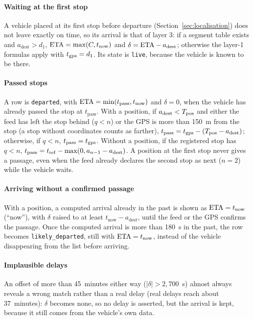 \paragraph{Waiting at the first stop} A vehicle placed at its first stop before departure
(Section~\ref{sec:localisation}) does not leave exactly on time, so its
arrival is that of layer 3: if a segment table exists and $a_{\mathrm{dest}}>d_1$, $\mathrm{ETA}=\max(C,t_{\mathrm{now}})$ and
$\delta=\mathrm{ETA}-a_{\mathrm{dest}}$; otherwise the layer-1 formulas apply with $t_{\mathrm{gps}}=d_1$. Its state is \texttt{live},
because the vehicle is known to be there.

\paragraph{Passed stops} A row is \texttt{departed}, with $\mathrm{ETA}=\min(t_{\mathrm{pass}},t_{\mathrm{now}})$ and
$\delta=0$, when the vehicle has already passed the stop at $t_{\mathrm{pass}}$. With a position, if
$a_{\mathrm{dest}}<T_{\mathrm{pos}}$ and either the feed has left the stop behind ($q<n$) or the GPS is more than 150~m from the
stop (a stop without coordinates counts as farther), $t_{\mathrm{pass}}=t_{\mathrm{gps}}-(T_{\mathrm{pos}}-a_{\mathrm{dest}})$; otherwise,
if $q<n$, $t_{\mathrm{pass}}=t_{\mathrm{gps}}$. Without a position, if the registered stop has $q<n$,
$t_{\mathrm{pass}}=t_{\mathrm{ref}}-\max(0,a_{n-1}-a_{\mathrm{dest}})$. A position at the first stop never gives a passage, even
when the feed already declares the second stop as next ($n=2$) while the vehicle waits.

\paragraph{Arriving without a confirmed passage} With a position, a computed arrival already in the past is shown as
$\mathrm{ETA}=t_{\mathrm{now}}$ (``now''), with $\delta$ raised to at least $t_{\mathrm{now}}-a_{\mathrm{dest}}$, until the
feed or the GPS confirms the passage. Once the computed arrival is more than 180~s in the past, the row becomes
\texttt{likely\_departed}, still with $\mathrm{ETA}=t_{\mathrm{now}}$, instead of the vehicle disappearing from the list before
arriving.

\paragraph{Implausible delays} An offset of more than 45~minutes either way ($|\delta|>2{,}700$~s) almost always
reveals a wrong match rather than a real delay (real delays reach about 37~minutes): $\delta$ becomes none, so no
delay is asserted, but the arrival is kept, because it still comes from the vehicle's own data.

